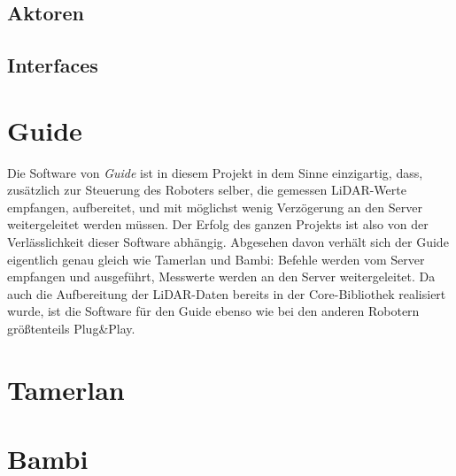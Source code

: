 \subsection{Aktoren}
\subsection{Interfaces}

\section{Guide}
\label{subsec:software_guide}
Die Software von \textit{Guide} ist in diesem Projekt in dem Sinne einzigartig,
dass,
zusätzlich zur Steuerung des Roboters selber,
die gemessen LiDAR-Werte empfangen,
aufbereitet,
und mit möglichst wenig Verzögerung an den Server weitergeleitet werden müssen.
%
Der Erfolg des ganzen Projekts ist also von der Verlässlichkeit dieser Software abhängig.
%
Abgesehen davon verhält sich der Guide eigentlich genau gleich wie Tamerlan und Bambi:
%
Befehle werden vom Server empfangen und ausgeführt,
Messwerte werden an den Server weitergeleitet.
%
Da auch die Aufbereitung der LiDAR-Daten bereits in der Core-Bibliothek realisiert wurde,
ist die Software für den Guide ebenso wie bei den anderen Robotern größtenteils Plug\&Play.

\section{Tamerlan}
\label{subsec:software_tamerlan}

\section{Bambi}
\label{subsec:software_bambi}
